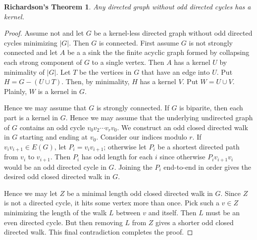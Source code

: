\documentclass[12pt]{article}
\theoremstyle{plain}
\newtheorem*{Richardson}{Richardson's Theorem}
\theoremstyle{definition}
\theoremstyle{remark}
\newcommand{\card}[1]{\left|#1\right|}
\begin{document}
\begin{Richardson}
Any directed graph without odd directed cycles has a kernel.
\end{Richardson}
\begin{proof}
Assume not and let $G$ be a kernel-less directed graph without odd directed cycles minimizing $\card{G}$.  Then $G$ is connected.  First assume $G$ is not strongly connected and let $A$ be a a sink the the finite acyclic graph formed by collapsing each strong component of $G$ to a single vertex.  Then $A$ has a kernel $U$ by minimality of $\card{G}$.  Let $T$ be the vertices in $G$ that have an edge into $U$.  Put $H = G - (U \cup T)$.  Then, by minimality, $H$ has a kernel $V$.  Put $W = U \cup V$.  Plainly, $W$ is a kernel in $G$.

Hence we may assume that $G$ is strongly connected.  If $G$ is biparite, then each part is a kernel in $G$.  Hence we may assume that the underlying undirected graph of $G$ contains an odd cycle $v_0v_2\cdots v_rv_0$.  We construct an odd closed directed walk in $G$ starting and ending at $v_0$. Consider our indices modulo $r$. If $v_iv_{i+1} \in E(G)$, let $P_i = v_iv_{i+1}$; otherwise let $P_i$ be a shortest directed path from $v_i$ to $v_{i+1}$.  Then $P_i$ has odd length for each $i$ since otherwise $P_iv_{i+1}v_i$ would be an odd directed cycle in $G$.  Joining the $P_i$ end-to-end in order gives the desired odd closed directed walk in $G$.

Hence we may let $Z$ be a minimal length odd closed directed walk in $G$.  Since $Z$ is not a directed cycle, it hits some vertex more than once.  Pick such a $v \in Z$ minimizing the length of the walk $L$ between $v$ and itself.  Then $L$ must be an even directed cycle.  But then removing $L$ from $Z$ gives a shorter odd closed directed walk. This final contradiction completes the proof.
\end{proof}
\end{document}
